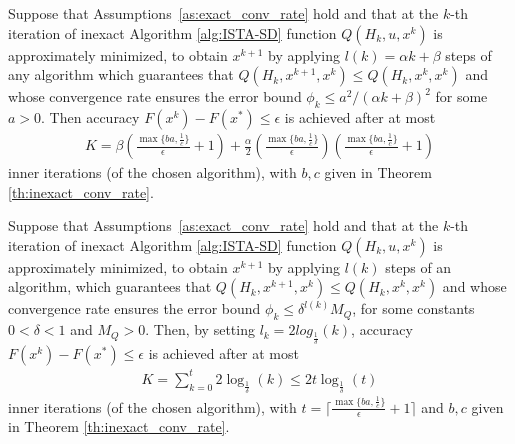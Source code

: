 \documentclass[11pt]{article}
\numberwithin{equation}{section}
\begin{document}
\begin{theorem}\label{th:inexact_total_conv_rate_k2}
Suppose that Assumptions~\ref{as:exact_conv_rate} hold and that at the $k$-th iteration of inexact Algorithm \ref{alg:ISTA-SD} 
function $Q(H_k, u, x^k)$ is approximately minimized, to obtain $x^{k+1}$ by applying $l(k)=\alpha k+\beta$ steps of any algorithm which guarantees that
 $Q(H_k, x^{k+1}, x^k)\leq Q(H_k, x^k, x^k)$ and whose convergence 
rate ensures  the error bound $\phi_k\leq a^2/(\alpha k+\beta)^2$ for some $a>0$.  Then accuracy $F(x^k) - F(x^*)\leq \epsilon$ is achieved after at most 
\begin{align}
    \label{eq:total_bound_F_F*}
	K=\beta( { \frac{\max\{b a, \frac{1}{c}\}}{\epsilon}} +1)+ \frac{\alpha}{2}({ \frac{\max\{b a, \frac{1}{c}\}}{\epsilon}})({ \frac{\max\{b a, \frac{1}{c}\}}{\epsilon}}+1)
\end{align}
inner iterations (of the chosen algorithm), 
with $b, c$  given in Theorem \ref{th:inexact_conv_rate}. 
\end{theorem}
\begin{theorem}\label{th:inexact_total_conv_rate_klogk}
Suppose that Assumptions~\ref{as:exact_conv_rate} hold and that at the $k$-th iteration of inexact Algorithm \ref{alg:ISTA-SD} 
function $Q(H_k, u, x^k)$ is approximately minimized, to obtain $x^{k+1}$ by applying  $l(k)$ steps of an algorithm, which guarantees that
 $Q(H_k, x^{k+1}, x^k)\leq Q(H_k, x^k, x^k)$ and whose convergence 
rate ensures  the error bound $\phi_k\leq \delta^{l(k)}M_Q$, for some constants $0<\delta<1$ and $M_Q>0$. 
 Then, by setting $l_k= 2 log_{\frac{1}{\delta}}(k)$, accuracy $F(x^k) - F(x^*)\leq \epsilon$ is achieved after at most 
\begin{align}
    \label{eq:total_bound_F_F*}
	K=\sum_{k=0}^t 2 \log_{\frac{1}{\delta}}(k)\leq 2t \log_{\frac{1}{\delta}}(t)
	\end{align}
	inner iterations (of the chosen algorithm), with $t=\lceil \frac{\max\{b a, \frac{1}{c}\}}{\epsilon} +1\rceil$
and  $b, c$  given in Theorem \ref{th:inexact_conv_rate}. 
\end{theorem}
\end{document}
